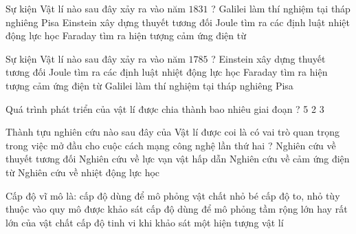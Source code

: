 \begin{ex}
Sự kiện Vật lí nào sau đây xảy ra vào năm $1831$ ?
\choice
{Galilei làm thí nghiệm tại tháp nghiêng Pisa}
{Einstein xây dựng thuyết tương đối}
{Joule tìm ra các định luật nhiệt động lực học}
{\True Faraday tìm ra hiện tượng cảm ứng điện từ}
\end{ex}

\begin{ex}
Sự kiện Vật lí nào sau đây xảy ra vào năm $1785$ ?
\choice
{Einstein xây dựng thuyết tương đối}
{\True Joule tìm ra các định luật nhiệt động lực học}
{Faraday tìm ra hiện tượng cảm ứng điện từ}
{Galilei làm thí nghiệm tại tháp nghiêng Pisa}
\end{ex}

\begin{ex}
Quá trình phát triển của vật lí được chia thành bao nhiêu giai đoạn ?
\choice
{5}
{}
{2}
{3}
\end{ex}

\begin{ex}
Thành tựu nghiên cứu nào sau đây của Vật lí được coi là có vai trò quan trọng trong việc mở đầu cho cuộc cách mạng công nghệ lần thứ hai ?
\choice
{Nghiên cứu về thuyết tương đối}
{Nghiên cứu về lực vạn vật hấp dẫn}
{\True Nghiên cứu về cảm ứng điện từ}
{Nghiên cứu về nhiệt động lực học}
\end{ex}

\begin{ex}
Cấp độ vĩ mô là:
\choice
{cấp độ dùng để mô phỏng vật chất nhỏ bé}
{cấp độ to, nhỏ tùy thuộc vào quy mô được khảo sát}
{\True cấp độ dùng để mô phỏng tầm rộng lớn hay rất lớn của vật chất}
{cấp độ tinh vi khi khảo sát một hiện tượng vật lí}
\end{ex}

